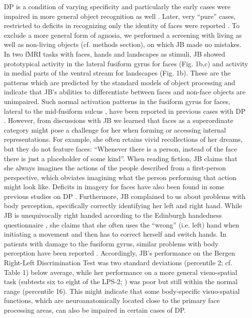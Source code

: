 \documentclass[fleqn,10pt]{SelfArx} %
\begin{document}
DP is a condition of varying specificity and particularly the early cases were impaired in more general object recognition as well \citep{McConachie_1976, Ariel_1996}. Later, very “pure” cases, restricted to deficits in recognizing only the identity of faces were reported \citep{Nunn_2001, Bentin_1999, Duchaine_2005}. To exclude a more general form of agnosia, we performed a screening with living as well as non-living objects (cf. methods section), on which JB made no mistakes. In two fMRI tasks with faces, hands and landscapes as stimuli, JB showed prototypical activity in the lateral fusiform gyrus for faces (Fig. 1b,c) and activity in medial parts of the ventral stream for landscapes (Fig. 1b). These are the patterns which are predicted by the standard models of object processing \citep{Grill_Spector_2014} and indicate that JB's abilities to differentiate between faces and non-face objects are unimpaired. Such normal activation patterns in the fusiform gyrus for faces, lateral to the mid-fusiform sulcus \citep{Weiner_2014}, have been reported in previous cases with DP \citep{Hasson_2003, Avidan_2005, Furl_2011}. However, from discussions with JB we learned that faces as a superordinate category might pose a challenge for her when forming or accessing internal representations. For example, she often retains vivid recollections of her dreams, but they do not feature faces: “Whenever there is a person, instead of the face there is just a placeholder of some kind”. When reading fiction, JB claims that she always imagines the actions of the people described from a first-person perspective, which obviates imagining what the person performing that action might look like. Deficits in imagery for faces have also been found in some previous studies on DP \citep{Gr_ter_2009, Tree_2010}.
Furthermore, JB complained to us about problems with body perception, specifically correctly identifying her left and right hand. While JB is unequivocally right handed according to the Edinburgh handedness questionnaire \citep{Oldfield_1971}, she claims that she often uses the “wrong” (i.e. left) hand when initiating a movement and then has to correct herself and switch hands. In patients with damage to the fusiform gyrus, similar problems with body perception have been reported \citep{Grewe_2014}. Accordingly, JB's performance on the Bergen Right-Left Discrimination Test \citep{Ofte_2002} was two standard deviations (percentile 2; cf. Table 1) below average, while her performance on a more general visuo-spatial task (subtests six to eight of the LPS-2; \citet{Horn}) was poor but still within the normal range (percentile 16). This might indicate that some body-specific visuo-spatial functions, which are neuroanatomically located close to the primary face processing areas, can also be impaired in certain cases of DP.
\end{document}
